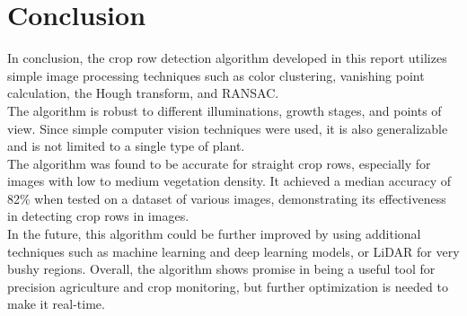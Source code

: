 \chapter{Conclusion}

In conclusion, the crop row detection algorithm developed in this report utilizes simple image processing techniques such as color clustering, vanishing point calculation, the Hough transform, and RANSAC. \\

The algorithm is robust to different illuminations, growth stages, and points of view. Since simple computer vision techniques were used, it is also generalizable and is not limited to a single type of plant. \\

The algorithm was found to be accurate for straight crop rows, especially for images with low to medium vegetation density. It achieved a median accuracy of 82\% when tested on a dataset of various images, demonstrating its effectiveness in detecting crop rows in images.  \\

In the future, this algorithm could be further improved by using additional techniques such as machine learning and deep learning models, or LiDAR for very bushy regions. Overall, the algorithm shows promise in being a useful tool for precision agriculture and crop monitoring, but further optimization is needed to make it real-time.